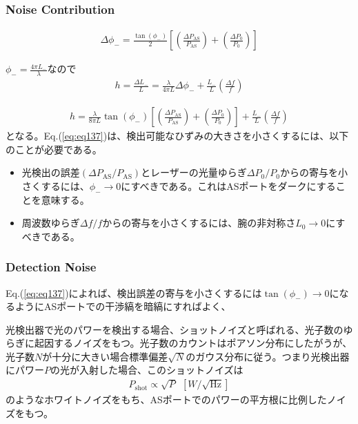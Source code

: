 \subsubsection{Noise Contribution}
\begin{eqnarray}
  \Delta{\phi_{-}} = \frac{\tan{(\phi_{-})}}{2} \left[\left(\frac{\Delta P_{\mathrm{AS}}}{P_{\mathrm{AS}}}\right) + \left(\frac{\Delta{P_0}}{P_0}\right) \right] 
\end{eqnarray}

$\phi_{-}=\frac{4\pi{L_{-}}}{\lambda}$なので
\begin{eqnarray}
  h = \frac{\Delta{L_{-}}}{L} = \frac{\lambda}{4\pi{L}}\Delta{\phi_{-}} + \frac{L_{-}}{L}\left(\frac{\Delta{f}}{f}\right)
\end{eqnarray}

\begin{eqnarray}
  h = \frac{\lambda}{8\pi{L}}\tan{(\phi_{-})} \left[\left(\frac{\Delta P_{\mathrm{AS}}}{P_{\mathrm{AS}}}\right) + \left(\frac{\Delta{P_0}}{P_0}\right) \right] + \frac{L_{-}}{L}\left(\frac{\Delta{f}}{f}\right) \label{eq:eq137}
\end{eqnarray} 
となる。Eq.(\ref{eq:eq137})は、検出可能なひずみの大きさを小さくするには、以下のことが必要である。
\begin{itemize}
  \setlength{\itemsep}{1pt}      %
  \setlength{\parskip}{-1pt}     %
  \setlength{\itemindent}{0pt}   %
  \setlength{\labelsep}{5pt}     %
\item 光検出の誤差$(\Delta P_{\mathrm{AS}}/P_{\mathrm{AS}})$とレーザーの光量ゆらぎ$\Delta{P_0}/P_0$からの寄与を小さくするには、$\phi_{-}\to0$にすべきである。これはASポートをダークにすることを意味する。
\item 周波数ゆらぎ$\Delta{f}/f$からの寄与を小さくするには、腕の非対称さ$L_{0}\to0$にすべきである。
\end{itemize}

\subsubsection{Detection Noise}
Eq.(\ref{eq:eq137})によれば、検出誤差の寄与を小さくするには$\tan{(\phi_{-})}\to0$になるようにASポートでの干渉縞を暗縞にすればよく、


光検出器で光のパワーを検出する場合、ショットノイズと呼ばれる、光子数のゆらぎに起因するノイズをもつ。光子数のカウントはポアソン分布にしたがうが、光子数$N$が十分に大きい場合標準偏差$\sqrt{N}$のガウス分布に従う。つまり光検出器にパワー$P$の光が入射した場合、このショットノイズは
\begin{eqnarray}
  P_{\mathrm{shot}} \propto \sqrt{P}\ \ [W/\sqrt{\mathrm{Hz}}]  \label{eq:eq136}
\end{eqnarray}
のようなホワイトノイズをもち、ASポートでのパワーの平方根に比例したノイズをもつ。


